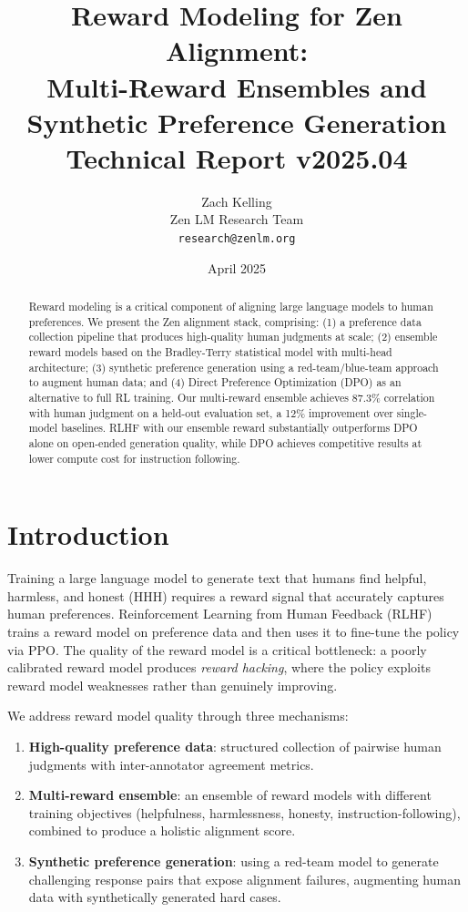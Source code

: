 \documentclass[11pt,a4paper]{article}
\title{\textbf{Reward Modeling for Zen Alignment:\\
Multi-Reward Ensembles and Synthetic Preference Generation}\\
\large Technical Report v2025.04}
\author{Zach Kelling \\ Zen LM Research Team\\
\texttt{research@zenlm.org}}
\date{April 2025}
\begin{document}
\maketitle

\begin{abstract}
Reward modeling is a critical component of aligning large language models to human
preferences. We present the Zen alignment stack, comprising: (1) a preference data
collection pipeline that produces high-quality human judgments at scale;
(2) ensemble reward models based on the Bradley-Terry statistical model with
multi-head architecture; (3) synthetic preference generation using a red-team/blue-team
approach to augment human data; and (4) Direct Preference Optimization (DPO) as an
alternative to full RL training. Our multi-reward ensemble achieves 87.3\% correlation
with human judgment on a held-out evaluation set, a 12\% improvement over single-model
baselines. RLHF with our ensemble reward substantially outperforms DPO alone on
open-ended generation quality, while DPO achieves competitive results at lower compute
cost for instruction following.
\end{abstract}

\tableofcontents
\newpage

\section{Introduction}
\label{sec:intro}

Training a large language model to generate text that humans find helpful, harmless, and
honest (HHH) \cite{askell2021general} requires a reward signal that accurately captures
human preferences. Reinforcement Learning from Human Feedback (RLHF)
\cite{christiano2017deep,ouyang2022training} trains a reward model on preference data and
then uses it to fine-tune the policy via PPO. The quality of the reward model is a
critical bottleneck: a poorly calibrated reward model produces \emph{reward hacking},
where the policy exploits reward model weaknesses rather than genuinely improving.

We address reward model quality through three mechanisms:

\begin{enumerate}
    \item \textbf{High-quality preference data}: structured collection of pairwise human
          judgments with inter-annotator agreement metrics.
    \item \textbf{Multi-reward ensemble}: an ensemble of reward models with different
          training objectives (helpfulness, harmlessness, honesty, instruction-following),
          combined to produce a holistic alignment score.
    \item \textbf{Synthetic preference generation}: using a red-team model to generate
          challenging response pairs that expose alignment failures, augmenting human data
          with synthetically generated hard cases.
\end{enumerate}
\end{document}
